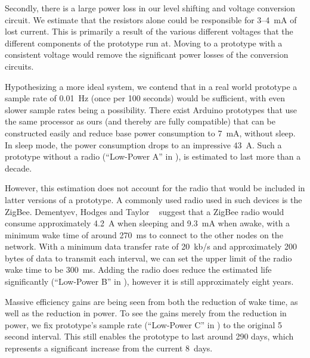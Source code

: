 \documentclass[../thesis/thesis.tex]{subfiles}
\begin{document}
Secondly, there is a large power loss in our level shifting and voltage conversion circuit. We estimate that the resistors alone could be responsible for 3--4~mA of lost current. This is primarily a result of the various different voltages that the different components of the prototype run at. Moving to a prototype with a consistent voltage would remove the significant power losses of the conversion circuits.

Hypothesizing a more ideal system, we contend that in a real world prototype a sample rate of 0.01~Hz (once per 100 seconds) would be sufficient, with even slower sample rates being a possibility. There exist Arduino prototypes that use the same processor as ours (and thereby are fully compatible) that can be constructed easily and reduce base power consumption to 7~mA, without sleep. In sleep mode, the power consumption drops to an impressive 43~\textmu A. Such a prototype without a radio (``Low-Power A'' in ), is estimated to last more than a decade.

However, this estimation does not account for the radio that would be included in latter versions of a prototype. A commonly used radio used in such devices is the ZigBee. Dementyev, Hodges and Taylor \etal~\cite{dementyev2013power} suggest that a ZigBee radio would consume approximately 4.2~\textmu A when sleeping and 9.3~mA when awake, with a minimum wake time of around 270~ms to connect to the other nodes on the network. With a minimum data transfer rate of 20~kb/s and approximately 200 bytes of data to transmit each interval, we can set the upper limit of the radio wake time to be 300~ms. Adding the radio does reduce the estimated life significantly (``Low-Power B'' in ), however it is still approximately eight years.

Massive efficiency gains are being seen from both the reduction of wake time, as well as the reduction in power. To see the gains merely from the reduction in power, we fix prototype's sample rate (``Low-Power C'' in ) to the original 5 second interval. This still enables the prototype to last around 290 days, which represents a significant increase from the current 8~days.

\end{document}
